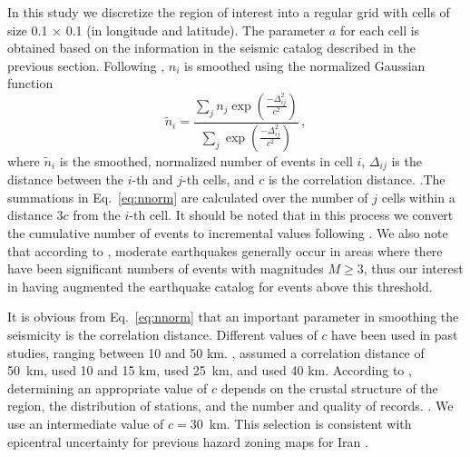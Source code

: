 In this study we discretize the region of interest into a regular grid with cells of size 0.1\textdegree{} $\times$ 0.1\textdegree{} (in longitude and latitude). The parameter $a$ for each cell is obtained based on the information in the seismic catalog described in the previous section. Following \citet{Frankel1995}, $n_i$ is smoothed using the normalized Gaussian function
% 
\begin{equation}
	\tilde{n}_i = \frac
		{ \sum_{j} n_{j} \exp ( \frac{ -\Delta_{ij}^{2} }{ c^2 } ) }
		{ \sum_{j} \exp ( \frac{ -\Delta_{ij}^{2} }{ c^2 } ) }
	\, ,
	\label{eq:nnorm}
\end{equation}
% 
where $\tilde{n}_i$ is the smoothed, normalized number of events in cell $i$, $\Delta_{ij}$ is the distance between the $i$-th and $j$-th cells, and $c$ is the correlation distance. .The summations in Eq.~\ref{eq:nnorm} are calculated over the number of $j$ cells within a distance $3c$ from the $i$-th cell. It should be noted that in this process we convert the cumulative number of events to incremental values following \citet{Herrmann1977}. We also note that according to \citet{Frankel1995}, moderate earthquakes generally occur in areas where there have been significant numbers of events with magnitudes $M \geq 3$, thus our interest in having augmented the earthquake catalog for events above this threshold.

It is obvious from Eq.~\ref{eq:nnorm} that an important parameter in smoothing the seismicity is the correlation distance. Different values of $c$ have been used in past studies, ranging between 10 and 50 km. \citet{Frankel1995},  assumed a correlation distance of 50~km, \citet{Foteva2006} used 10 and 15 km, \citet{Barani2007} used 25~km, and \citet{Khodaverdian_2016_BSSA} used 40 km. According to \citet{Mirzaei1997}, determining an appropriate value of $c$ depends on the crustal structure of the region, the distribution of stations, and the number and quality of records. . We use an intermediate value of $c=30$~km. This selection is consistent with epicentral uncertainty for previous hazard zoning maps for Iran \citep[see][]{Zare2012}.


